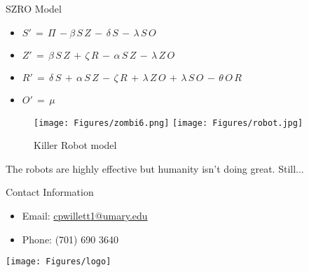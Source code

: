 \documentclass[final]{beamer}
\newlength{\onecolwid}
\begin{document}
\begin{frame}[t]
\begin{columns}[t]
\begin{column}{\onecolwid}
\begin{block}{ SZRO Model }
\begin{small}
\begin{itemize}
\item $S'\,=\,\Pi\,-\beta\,S\,Z\,-\,\delta\,S\,-\,\lambda\,S\,O$ 
\item $Z'\,=\,\beta\,S\,Z\,+\,\zeta\,R\,-\,\alpha\,S\,Z\,-\,\lambda\,Z\,O$
\item $R'\,=\,\delta\,S\,+\,\alpha\,S\,Z\,-\,\zeta\,R\,+\,\lambda\,Z\,O\,+\,\lambda\,S\,O\,-\,\theta\,O\,R$
\item $O'\,=\,\mu$
\end{itemize}
\end{small}


\begin{tcolorbox}[breakable, title=\textbf{SZRO.c}]

\end{tcolorbox}

\begin{figure}
\texttt{[image: Figures/zombi6.png]}
\texttt{[image: Figures/robot.jpg]}
\caption{ Killer Robot model }
\end{figure}

The robots are highly effective but humanity isn't doing great. Still...


\end{block}




\begin{alertblock}{Contact Information}
\begin{itemize}
\item Email: \href{mailto:cpwillett1@umary.edu}{cpwillett1@umary.edu}
\item Phone: (701) 690 3640
\end{itemize}
\end{alertblock}

\vspace{-0.4in}
\begin{center}
\texttt{[image: Figures/logo]}
\end{center}


\end{column}
\end{columns} 
\end{frame} 
\end{document}
